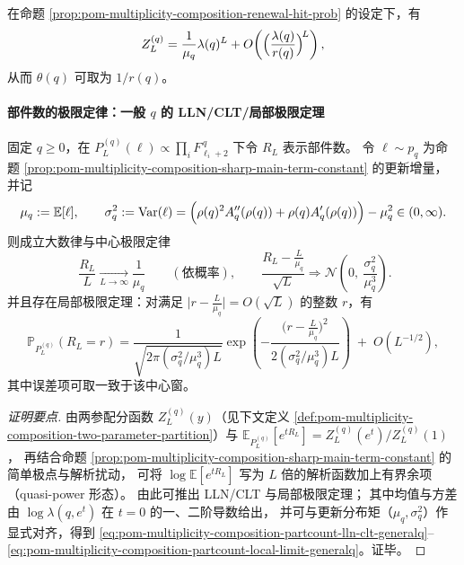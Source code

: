 \begin{corollary}\label{cor:pom-multiplicity-composition-sharp-main-term-from-renewal}
在命题 \ref{prop:pom-multiplicity-composition-renewal-hit-prob} 的设定下，有
\[
Z_L^{(q)}=\frac{1}{\mu_q}\lambda(q)^L+O\!\left(\Bigl(\frac{\lambda(q)}{r(q)}\Bigr)^{\!L}\right),
\]
从而 \(\theta(q)\) 可取为 \(1/r(q)\)。
\end{corollary}



\paragraph{部件数的极限定律：一般 \texorpdfstring{$q$}{q} 的 LLN/CLT/局部极限定理}
\begin{theorem}\label{thm:pom-multiplicity-composition-partcount-generalq-llt}
固定 \(q\ge 0\)，在 \(P_L^{(q)}(\boldsymbol{\ell})\propto \prod_i F_{\ell_i+2}^{\,q}\) 下令 \(R_L\) 表示部件数。
令 \(\ell\sim p_q\) 为命题 \ref{prop:pom-multiplicity-composition-sharp-main-term-constant} 的更新增量，
并记
\[
\mu_q:=\mathbb{E}[\ell],\qquad
\sigma_q^2:=\mathrm{Var}(\ell)=\Bigl(\rho(q)^2A_q''(\rho(q))+\rho(q)A_q'(\rho(q))\Bigr)-\mu_q^2\in(0,\infty).
\]
则成立大数律与中心极限定律
\begin{equation}\label{eq:pom-multiplicity-composition-partcount-lln-clt-generalq}
\boxed{\;
\frac{R_L}{L}\xrightarrow[L\to\infty]{}\frac{1}{\mu_q}\qquad(\text{依概率}),\qquad
\frac{R_L-\frac{L}{\mu_q}}{\sqrt{L}}\Longrightarrow \mathcal{N}\!\left(0,\ \frac{\sigma_q^2}{\mu_q^{3}}\right).}
\end{equation}
并且存在局部极限定理：对满足 \(\bigl|r-\frac{L}{\mu_q}\bigr|=O(\sqrt{L})\) 的整数 \(r\)，有
\begin{equation}\label{eq:pom-multiplicity-composition-partcount-local-limit-generalq}
\mathbb{P}_{P_L^{(q)}}(R_L=r)
=\frac{1}{\sqrt{2\pi(\sigma_q^2/\mu_q^3)L}}
\exp\!\left(-\frac{\bigl(r-\frac{L}{\mu_q}\bigr)^2}{2(\sigma_q^2/\mu_q^3)L}\right)
\;+\;O(L^{-1/2}),
\end{equation}
其中误差项可取一致于该中心窗。
\end{theorem}
\begin{proof}[证明要点]
由两参配分函数 \(Z_L^{(q)}(y)\)（见下文定义 \ref{def:pom-multiplicity-composition-two-parameter-partition}）与
\(
\mathbb{E}_{P_L^{(q)}}[e^{tR_L}]=Z_L^{(q)}(e^t)/Z_L^{(q)}(1)
\)，
再结合命题 \ref{prop:pom-multiplicity-composition-sharp-main-term-constant} 的简单极点与解析扰动，
可将 \(\log \mathbb{E}[e^{tR_L}]\) 写为 \(L\) 倍的解析函数加上有界余项（quasi-power 形态）。
由此可推出 LLN/CLT 与局部极限定理；
其中均值与方差由 \(\log\lambda(q,e^t)\) 在 \(t=0\) 的一、二阶导数给出，
并可与更新分布矩（\(\mu_q,\sigma_q^2\)）作显式对齐，得到 \eqref{eq:pom-multiplicity-composition-partcount-lln-clt-generalq}--\eqref{eq:pom-multiplicity-composition-partcount-local-limit-generalq}。证毕。
\end{proof}

